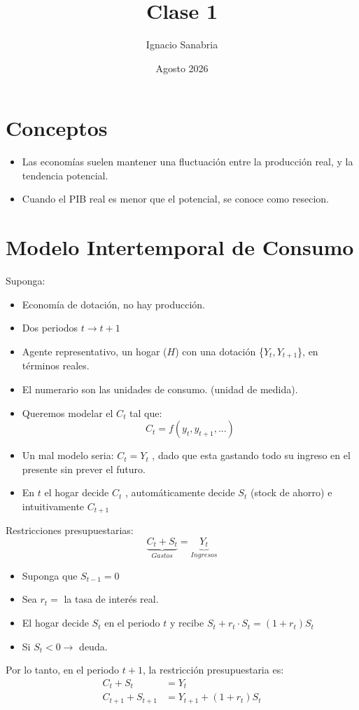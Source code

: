 \documentclass[12pt]{article}
\title{Clase 1}
\author{Ignacio Sanabria}
\date{Agosto 2026}
\begin{document}
\maketitle
\section{Conceptos}
\begin{itemize}
    \item Las economías suelen mantener una fluctuación entre la producción real, y la tendencia potencial. 
    \item Cuando el PIB real es menor que el potencial, se conoce como resecion. 
    
\end{itemize}
\section{Modelo Intertemporal de Consumo}
Suponga: 
\begin{itemize}
    \item Economía de dotación, no hay producción.
    \item Dos periodos $t\xrightarrow{}t+1$
    \item Agente representativo, un hogar ($H$) con una dotación \{$Y_t,Y_{t+1}$\}, en términos reales. 
    \item El numerario son las unidades de consumo. (unidad de medida).
    \item Queremos modelar el $C_t$ tal que: $$C_t=f(y_t,y_{t+1},...)$$
    \item Un mal modelo seria: $C_t=Y_t$ , dado que esta gastando todo su ingreso en el presente sin prever el futuro. 
    \item En $t$ el hogar decide $C_t$ , automáticamente decide $S_t$ (stock de ahorro) e intuitivamente $C_{t+1}$ 
\end{itemize}
Restricciones presupuestarias: 
\[\underbrace{C_t+S_t}_{Gastos} = \underbrace{Y_t}_{Ingresos} \]
\begin{itemize}
    \item Suponga que $S_{t-1}=0$
    \item Sea $r_t=$ la tasa de interés real.
    \item El hogar decide $S_t$ en el periodo $t$ y recibe $S_t+r_t\cdot S_t = (1+r_t)S_t $
    \item Si $S_t<0 \xrightarrow{}$ deuda. 
\end{itemize}
Por lo tanto, en el periodo $t+1$, la restricción presupuestaria es:
\begin{align*}
    C_t+S_t & =Y_t \\ C_{t+1}+S_{t+1} & =Y_{t+1}+(1+r_t)S_t
\end{align*}
\end{document}
